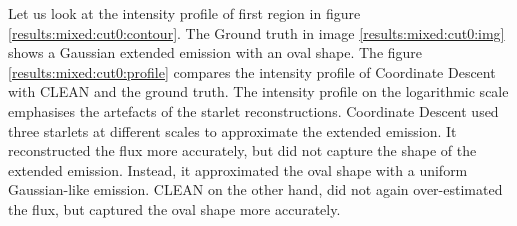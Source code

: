 Let us look at the intensity profile of first region in figure \ref{results:mixed:cut0:contour}. The Ground truth in image \ref{results:mixed:cut0:img} shows a Gaussian extended emission with an oval shape. The figure \ref{results:mixed:cut0:profile} compares the intensity profile of Coordinate Descent with CLEAN and the ground truth. The intensity profile on the logarithmic scale emphasises the artefacts of the starlet reconstructions. Coordinate Descent used three starlets at different scales to approximate the extended emission. It reconstructed the flux more accurately, but did not capture the shape of the extended emission. Instead, it approximated the oval shape with a uniform Gaussian-like emission. CLEAN on the other hand, did not again over-estimated the flux, but captured the oval shape more accurately.

